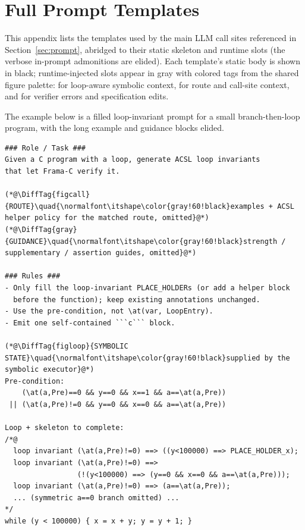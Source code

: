 \section{Full Prompt Templates}
\label{app:prompts}

\DIFaddbegin
This appendix lists the templates used by the main LLM call sites referenced in Section~\ref{sec:prompt}, abridged to their static skeleton and runtime slots (the verbose in-prompt admonitions are elided). Each template's static body is shown in black; runtime-injected slots appear in gray with colored tags from the shared figure palette:  for loop-aware symbolic context,  for route and call-site context, and  for verifier errors and specification edits.
\DIFaddend



\DIFaddbegin
The example below is a filled loop-invariant prompt for a small branch-then-loop program, with the long example and guidance blocks elided.
\DIFaddend

\begin{tcolorbox}[promptboxcompact, title={Loop-invariant generation prompt}]
\begin{lstlisting}[style=PromptInnerCompact]
### Role / Task ###
Given a C program with a loop, generate ACSL loop invariants
that let Frama-C verify it.

(*@\DiffTag{figcall}{ROUTE}\quad{\normalfont\itshape\color{gray!60!black}examples + ACSL helper policy for the matched route, omitted}@*)
(*@\DiffTag{gray}{GUIDANCE}\quad{\normalfont\itshape\color{gray!60!black}strength / supplementary / assertion guides, omitted}@*)

### Rules ###
- Only fill the loop-invariant PLACE_HOLDERs (or add a helper block
  before the function); keep existing annotations unchanged.
- Use the pre-condition, not \at(var, LoopEntry).
- Emit one self-contained ```c``` block.

(*@\DiffTag{figloop}{SYMBOLIC STATE}\quad{\normalfont\itshape\color{gray!60!black}supplied by the symbolic executor}@*)
Pre-condition:
    (\at(a,Pre)==0 && y==0 && x==1 && a==\at(a,Pre))
 || (\at(a,Pre)!=0 && y==0 && x==0 && a==\at(a,Pre))

Loop + skeleton to complete:
/*@
  loop invariant (\at(a,Pre)!=0) ==> ((y<100000) ==> PLACE_HOLDER_x);
  loop invariant (\at(a,Pre)!=0) ==>
                 (!(y<100000) ==> (y==0 && x==0 && a==\at(a,Pre)));
  loop invariant (\at(a,Pre)!=0) ==> (a==\at(a,Pre));
  ... (symmetric a==0 branch omitted) ...
*/
while (y < 100000) { x = x + y; y = y + 1; }
\end{lstlisting}
\end{tcolorbox}

